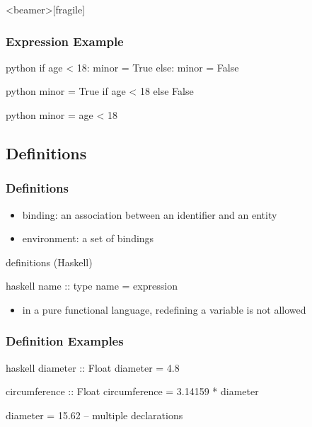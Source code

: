 \documentclass[dvipsnames]{beamer}
\theoremstyle{plain}
\begin{document}
\begin{frame}<beamer>[fragile]
  \frametitle{Expression Example}

  \begin{pygments}{python}
if age < 18:
    minor = True
else:
    minor = False
  \end{pygments}

  \medskip
  \begin{pygments}{python}
minor = True if age < 18 else False
  \end{pygments}

  \pause
  \bigskip
  \begin{pygments}{python}
minor = age < 18
  \end{pygments}
\end{frame}

\subsection{Definitions}

\begin{frame}[fragile]
  \frametitle{Definitions}

  \medskip
  \begin{itemize}
    \item \alert{binding}: an association between an identifier and an entity
    \item \alert{environment}: a set of bindings
  \end{itemize}

  \begin{block}{definitions (Haskell)}
    \begin{pygments}{haskell}
name :: type
name = expression
    \end{pygments}
  \end{block}

  \pause
  \medskip
  \begin{itemize}
    \item in a pure functional language, redefining a variable is not allowed
  \end{itemize}
\end{frame}

\begin{frame}[fragile]
  \frametitle{Definition Examples}

  \begin{exampleblock}{}
    \begin{pygments}{haskell}
diameter :: Float
diameter = 4.8

circumference :: Float
circumference = 3.14159 * diameter

diameter = 15.62       -- multiple declarations
    \end{pygments}
  \end{exampleblock}
\end{frame}
\end{document}
